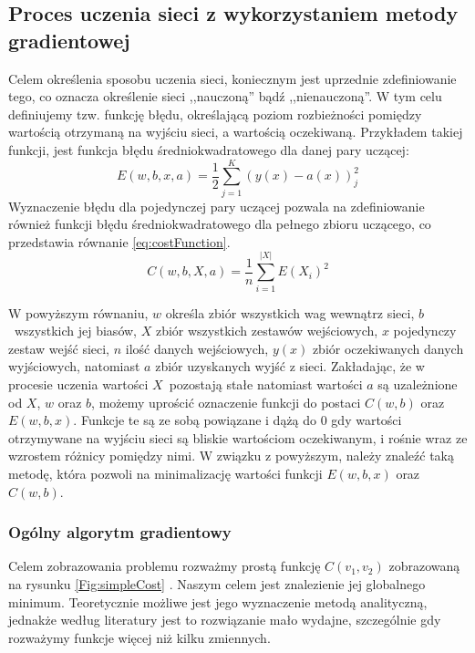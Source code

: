 \documentclass[12pt,twoside]{article}
\begin{document}
\subsection{Proces uczenia sieci z wykorzystaniem metody gradientowej}
Celem określenia sposobu uczenia sieci, koniecznym jest uprzednie zdefiniowanie tego, co oznacza określenie sieci ,,nauczoną'' bądź ,,nienauczoną''.
W tym celu definiujemy tzw. funkcję błędu, określającą poziom rozbieżności pomiędzy wartością otrzymaną na wyjściu sieci, a wartością oczekiwaną.
Przykładem takiej funkcji\cite{kiaSingleLayer}, jest funkcja błędu średniokwadratowego dla danej pary uczącej:
\begin{equation}
	E(w, b, x, a) = \frac{1}{2}\sum_{j=1}^{K}(y(x) - a(x))^2_j
\end{equation}
Wyznaczenie błędu dla pojedynczej pary uczącej pozwala na zdefiniowanie również funkcji błędu średniokwadratowego dla pełnego zbioru uczącego\cite{nndl}, co przedstawia równanie \ref{eq:costFunction}.
\begin{equation}
	\label{eq:costFunction}
	C\left( w, b, X, a\right) = \frac{1}{n} \sum\limits_{i = 1}^{|X|} E(X_i)^2
\end{equation}

W powyższym równaniu, $w$ określa zbiór wszystkich wag wewnątrz sieci, $b$~wszystkich jej biasów, $X$ zbiór wszystkich zestawów wejściowych, $x$ pojedynczy zestaw wejść sieci, $n$ ilość danych wejściowych, $y(x)$ zbiór oczekiwanych danych wyjściowych, natomiast $a$ zbiór uzyskanych wyjść z sieci.
Zakładając, że w procesie uczenia wartości $X$~pozostają stałe natomiast wartości $a$ są uzależnione od $X$, $w$ oraz $b$, możemy uprościć oznaczenie funkcji do postaci $C (w,b)$ oraz $E(w, b, x)$.
Funkcje te są ze sobą powiązane i dążą do 0 gdy wartości otrzymywane na wyjściu sieci są bliskie wartościom oczekiwanym, i rośnie wraz ze wzrostem różnicy pomiędzy nimi.
W związku z powyższym, należy znaleźć taką metodę, która pozwoli na minimalizację wartości funkcji $E(w, b, x)$ oraz $C(w,b)$. \cite{nndl}

\subsubsection{Ogólny algorytm gradientowy}
Celem zobrazowania problemu rozważmy prostą funkcję $C(v_1, v_2)$ zobrazowaną na rysunku \ref{Fig:simpleCost} \cite{nndl}.
Naszym celem jest znalezienie jej globalnego minimum.
Teoretycznie możliwe jest jego wyznaczenie metodą analityczną, jednakże według literatury \cite{nndl} jest to rozwiązanie mało wydajne, szczególnie gdy rozważymy funkcje więcej niż kilku zmiennych.
\end{document}
